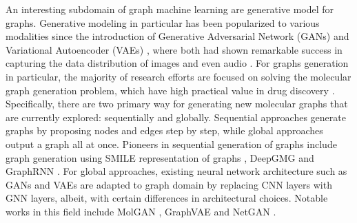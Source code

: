 An interesting subdomain of graph machine learning are generative model for
graphs. Generative modeling in particular has been popularized to various
modalities since the introduction of Generative Adversarial Network (GANs)
\cite{goodfellowGenerativeAdversarialNetworks2014} and Variational Autoencoder
(VAEs) \cite{kingmaAutoEncodingVariationalBayes2014}, where both had shown
remarkable success in capturing the data distribution of images and even audio
\cite{hersheyCNNArchitecturesLargescale2017}. For graphs generation in
particular, the majority of research efforts are focused on solving the
molecular graph generation problem, which have high practical value in drug
discovery \cite{wuComprehensiveSurveyGraph2021}. Specifically, there are two
primary way for generating new molecular graphs that are currently explored:
sequentially and globally. Sequential approaches generate graphs by proposing
nodes and edges step by step, while global approaches output a graph all at
once. Pioneers in sequential generation of graphs include graph generation using
SMILE representation of graphs
\cite{daiSyntaxdirectedVariationalAutoencoder2018,
	kusnerGrammarVariationalAutoencoder2017,
	gomez-bombarelliAutomaticChemicalDesign2018}, DeepGMG
 and GraphRNN
\cite{youGraphRNNGeneratingRealistic2018}. For global approaches, existing
neural network architecture such as GANs and VAEs are adapted to graph domain by
replacing CNN layers with GNN layers, albeit, with certain differences in
architectural choices. Notable works in this field include MolGAN
\cite{decaoMolGANImplicitGenerative2018}, GraphVAE
\cite{simonovskyGraphVAEGenerationSmall2018} and NetGAN
\cite{bojchevskiNetGANGeneratingGraphs2018}.


